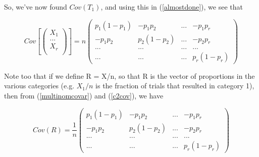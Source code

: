 So, we've now found $Cov(T_1)$, and using this in (\ref{almostdone}), 
we see that 

\begin{equation}
\label{multinomcovar}
Cov \left [
\left ( \begin{array}{r}
X_1 \\
... \\
X_r \\
\end{array} \right )
\right ]
= n 
\left (
\begin{array}{cccc}
p_1 (1-p_1) & -p_1 p_2 & ... & -p_1 p_r \\
-p_1 p_2 & p_2 (1-p_2) & ... & -p_2 p_r \\
...  & ... & ... & ... \\
...  & ... & ... & p_r (1-p_r)
\end{array}
\right )
\end{equation}

Note too that if we define R = X/n, so that R is the vector of
proportions in the various categories (e.g. $X_1/n$ is the fraction of
trials that resulted in category 1), then from (\ref{multinomcovar}) and
(\ref{c2cov}), we have

\begin{equation}
\label{propcov}
Cov(R) = \frac{1}{n}
\left (
\begin{array}{cccc}
p_1 (1-p_1) & -p_1 p_2 & ... & -p_1 p_r \\
-p_1 p_2 & p_2 (1-p_2) & ... & -p_2 p_r \\
...  & ... & ... & ... \\
...  & ... & ... & p_r (1-p_r)
\end{array}
\right )
\end{equation}

